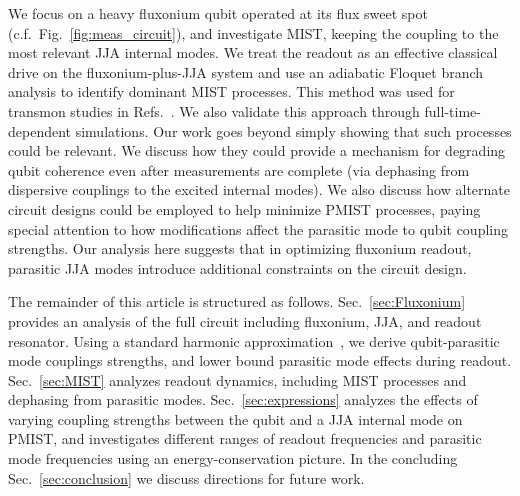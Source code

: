 \documentclass[%
reprint,
superscriptaddress,
 amsmath,amssymb,
 aps,
 prx,
longbibliography,
floatfix,
]{revtex4-2}
\begin{document}
We focus on a heavy fluxonium qubit operated at its flux sweet spot (c.f.~Fig.~\ref{fig:meas_circuit}), and investigate MIST, keeping the coupling to the most relevant JJA internal modes. We treat the readout as an effective classical drive on the fluxonium-plus-JJA system and use an adiabatic Floquet branch analysis to identify dominant MIST processes. This method was used for transmon studies in Refs.~\cite{cohen2023reminiscence,dumas2024unified}. We also validate this approach through full-time-dependent simulations.  
Our work goes beyond simply showing that such processes could be relevant.  We discuss how they could provide a mechanism for degrading qubit coherence even after measurements are complete (via dephasing from dispersive couplings to the excited internal modes).  We also discuss how alternate circuit designs could be employed to help minimize PMIST processes, paying special attention to how modifications affect the parasitic mode to qubit coupling strengths.  Our analysis here suggests that in optimizing fluxonium readout, parasitic JJA modes introduce additional constraints on the circuit design.     

The remainder of this article is structured as follows. Sec.~\ref{sec:Fluxonium}
provides an analysis of the full circuit including fluxonium, JJA, and readout resonator.  Using a standard harmonic approximation~\cite{viola2015collective}, we derive qubit-parasitic mode couplings strengths, and lower bound parasitic mode effects during readout. Sec.~\ref{sec:MIST} analyzes readout dynamics, including MIST processes and dephasing from parasitic modes. Sec.~\ref{sec:expressions} analyzes the effects of varying coupling strengths between the qubit and a JJA internal mode on PMIST, and investigates different ranges of readout frequencies and parasitic mode frequencies using an energy-conservation picture. In the concluding Sec.~\ref{sec:conclusion} we discuss directions for future work.
\end{document}
